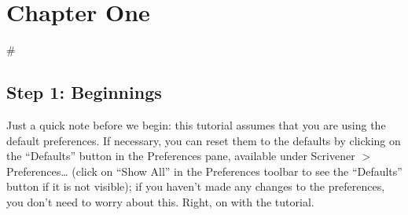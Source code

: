 \documentclass[10pt,oneside]{memoir}
\title{\mytitle}
\author{\myauthor}
\def\mychapterstyle{default}
\def\mypagestyle{headings}
\def\revision{}
\begin{document}
\chapterstyle{\mychapterstyle}
\pagestyle{\mypagestyle}

%
%

\frontmatter



\maketitle
\clearpage

\vspace*{\fill}

\setlength{\parindent}{0pt}

\ifx\mycopyright\undefined
\else
	\textcopyright{} \mycopyright
\fi

\revision

\begin{center}
\end{center}

\setlength{\parindent}{1em}
\clearpage

\tableofcontents


%
%


\setlength{\parindent}{1em}

\mainmatter
\part{Chapter One}
\label{chapterone}

\#  


\chapter{Step 1: Beginnings}
\label{step1:beginnings}

Just a quick note before we begin: this tutorial assumes that you are using the default preferences. If necessary, you can reset them to the defaults by clicking on the ``Defaults'' button in the Preferences pane, available under Scrivener $>$ Preferences{\ldots} (click on ``Show All'' in the Preferences toolbar to see the ``Defaults'' button if it is not visible); if you haven't made any changes to the preferences, you don't need to worry about this. Right, on with the tutorial.
\end{document}
